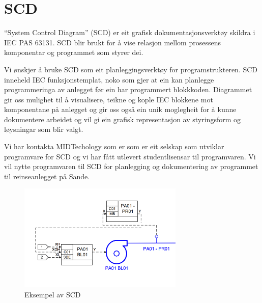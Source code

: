 \section{SCD}
\thispagestyle{fancy}


``System Control Diagram'' (\gls{SCD})  er eit grafisk dokumentasjonsverktøy skildra i \gls{IEC} \gls{PAS} 63131.\newline
 \gls{SCD} blir brukt for å vise relasjon mellom prosessens komponentar og programmet som styrer dei.
 
 Vi ønskjer å bruke \gls{SCD} som eit planleggingsverktøy for programstrukteren. \gls{SCD} inneheld \gls{IEC} funksjonstemplat, noko som gjer at ein kan
 planlegge programmeringa av anlegget før ein har programmert blokkkoden.
 Diagrammet gir oss mulighet til å visualisere, teikne og kople \gls{IEC} blokkene mot komponentane på anlegget og 
 gir oss også ein unik moglegheit for å kunne dokumentere arbeidet og vil gi ein grafisk representasjon
 av styringsform og løysningar som blir valgt.

 Vi har kontakta MIDTechology \citep{MIDT} som er som er eit selskap som utviklar programvare for \gls{SCD} og vi har fått utlevert studentlisensar
 til programvaren. Vi vil nytte programvaren til \gls{SCD} for planlegging og dokumentering av programmet til reinseanlegget på Sande. \newline \newline \newline

 \begin{figure}[htbp]
    \centering
    \includegraphics[width=0.7\textwidth]{Bilder/Visio_eksempel.png}
    \caption{Eksempel av \gls{SCD}}\label{fig:SCD eksempel}    
\end{figure}

\newpage